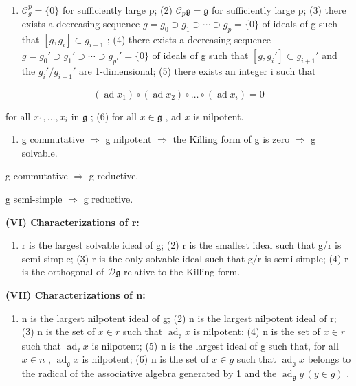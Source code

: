 \begin{enumerate}
\def\labelenumi{(\arabic{enumi})}
\tightlist
\item
  \(\mathcal{C}_{g}^{p} = \{0\}\) for sufficiently large p; (2) \(\mathcal{C}_{p}\mathfrak{g} = \mathfrak{g}\) for sufficiently large p; (3) there exists a decreasing sequence \(g = g_{0} \supset g_{1} \supset \cdots \supset g_{p} = \{0\}\) of ideals of g such that \([g, g_{i}] \subset g_{i+1}\) ; (4) there exists a decreasing sequence \(g = g_{0}' \supset g_{1}' \supset \cdots \supset g_{p'}' = \{0\}\) of ideals of g such that \([g, g_{i}'] \subset g_{i+1}'\) and the \(g_{i}'/g_{i+1}'\) are 1-dimensional; (5) there exists an integer i such that
\end{enumerate}

\[
\left(\operatorname{ad} x _ {1}\right) \circ \left(\operatorname{ad} x _ {2}\right) \circ \dots \circ \left(\operatorname{ad} x _ {i}\right) = 0
\]

for all \(x_{1},\ldots ,x_{i}\) in \(\mathfrak{g}\) ; (6) for all \(x\in \mathfrak{g}\) , ad \(x\) is nilpotent.

\begin{enumerate}
\def\labelenumi{(\Alph{enumi})}
\setcounter{enumi}{21}
\tightlist
\item
  g commutative \(\Rightarrow\) g nilpotent \(\Rightarrow\) the Killing form of g is zero \(\Rightarrow\) g solvable.
\end{enumerate}

g commutative \(\Rightarrow\) g reductive.

g semi-simple \(\Rightarrow\) g reductive.

\textbf{(VI) Characterizations of r:}

\begin{enumerate}
\def\labelenumi{(\arabic{enumi})}
\tightlist
\item
  r is the largest solvable ideal of g; (2) r is the smallest ideal such that g/r is semi-simple; (3) r is the only solvable ideal such that g/r is semi-simple; (4) r is the orthogonal of \(\mathcal{D}\mathfrak{g}\) relative to the Killing form.
\end{enumerate}

\textbf{(VII) Characterizations of n:}

\begin{enumerate}
\def\labelenumi{(\arabic{enumi})}
\tightlist
\item
  n is the largest nilpotent ideal of g; (2) n is the largest nilpotent ideal of r; (3) n is the set of \(x \in r\) such that \(\operatorname{ad}_{\mathfrak{g}} x\) is nilpotent; (4) n is the set of \(x \in r\) such that \(\operatorname{ad}_{\mathfrak{r}} x\) is nilpotent; (5) n is the largest ideal of g such that, for all \(x \in n\) , \(\operatorname{ad}_{\mathfrak{g}} x\) is nilpotent; (6) n is the set of \(x \in g\) such that \(\operatorname{ad}_{\mathfrak{g}} x\) belongs to the radical of the associative algebra generated by 1 and the \(\operatorname{ad}_{\mathfrak{g}} y\,(y \in g)\) .
\end{enumerate}

